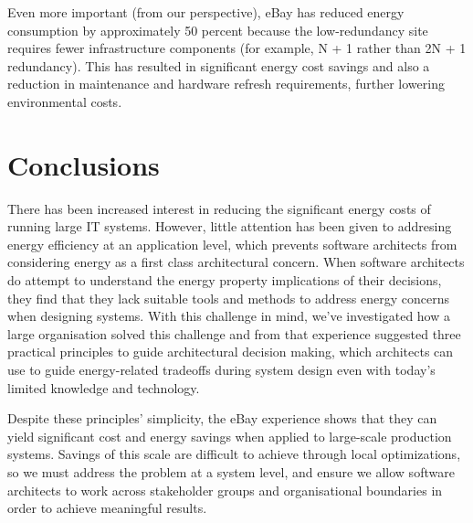 Even more important (from our perspective), eBay has reduced energy consumption by approximately 50 percent because the low-redundancy site requires fewer infrastructure components (for example, N + 1 rather than 2N + 1 redundancy). This has resulted in  significant energy cost savings and also a reduction in maintenance and hardware refresh requirements, further lowering environmental costs.

\section{Conclusions}

There has been increased interest in reducing the significant energy costs of running large IT systems. However, little attention has been given to addresing energy efficiency at an application level, which prevents software architects from considering energy as a first class architectural concern.  When software architects do attempt to understand the energy property implications of their decisions, they find that they lack suitable tools and methods to address energy concerns when designing systems. With this challenge in mind, we've investigated how a large organisation solved this challenge and from that experience suggested three practical principles to guide architectural decision making, which architects can use to guide energy-related tradeoffs during system design even with today's limited knowledge and technology.

Despite these principles' simplicity, the eBay experience shows that they can yield significant cost and energy savings when applied to large-scale production systems. Savings of this scale are difficult to achieve through local optimizations, so we must address the problem at a system level, and ensure we allow software architects to work across stakeholder groups and organisational boundaries in order to achieve meaningful results.
